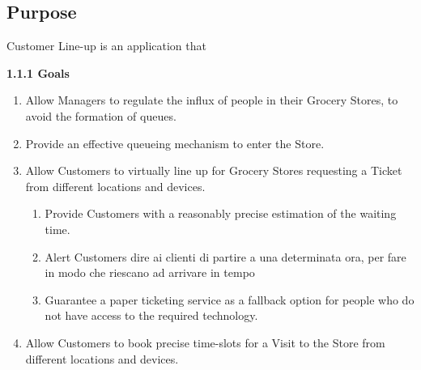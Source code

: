 \documentclass[a4paper, 10pt, oneside]{article}
\newcommand*{\lorenzo}[1]{\textcolor{BurntOrange}{#1}}
\begin{document}
\subsection{Purpose}
\label{intro:purpose}

Customer Line-up is an application that
 

{\large \textbf{1.1.1 Goals}}

\begin{enumerate}[label={G.\arabic{*}}]
    \item \label{goal:influx} Allow Managers to regulate the influx of people in their Grocery Stores, to avoid the formation of queues.
    \item Provide an effective queueing mechanism to enter the Store.
    \item \label{goal:enqueue} Allow Customers to virtually line up for Grocery Stores requesting a Ticket from different locations and devices.
    \begin{enumerate}[label={\ref{goal:enqueue}.\arabic{*}}]
        \item \label{goal:enque:time} Provide Customers with a reasonably precise estimation of the waiting time.
        \item \label{goal:enque:alert} Alert Customers \lorenzo{dire ai clienti di partire a una determinata ora, per fare in modo che riescano ad arrivare in tempo} %
        \item \label{goal:enque:fallback} Guarantee a paper ticketing service as a fallback option for people who do not have access to the required technology.
    \end{enumerate}
    \item \label{goal:visit} Allow Customers to book precise time-slots for a Visit to the Store from different locations and devices.

\end{enumerate}
\end{document}
